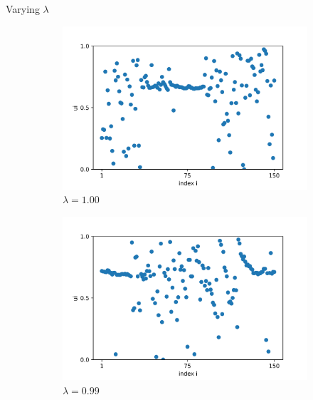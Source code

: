\documentclass{beamer}
\begin{document}
\begin{frame}{Varying $\lambda$}

\begin{figure}[H]
\begin{subfigure}{.32\textwidth}
  \centering
  \includegraphics[width=1\linewidth]{u_lambda=1.0_t=2000.png}  
  \caption{$\lambda=1.00$}
\end{subfigure}
\hfill
\begin{subfigure}{.32\textwidth}
  \centering
  \includegraphics[width=1\linewidth]{u_lambda=0.99_t=2000.png}  
  \caption{$\lambda=0.99$}
\end{subfigure}
\hfill
\begin{subfigure}{.32\textwidth}
  \centering

\end{subfigure}
\end{figure}
\end{frame}
\end{document}
